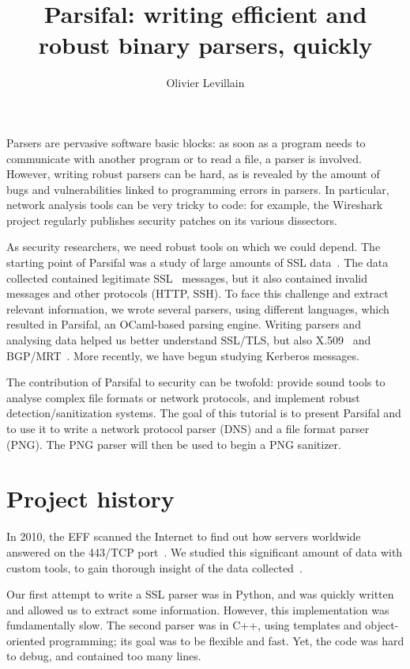 \documentclass{article}
\title{Parsifal: writing efficient and robust binary parsers, quickly}
\author{Olivier Levillain}
\date{}
\begin{document}
\maketitle

Parsers are pervasive software basic blocks: as soon as a program
needs to communicate with another program or to read a file, a parser
is involved. However, writing robust parsers can be hard, as is
revealed by the amount of bugs and vulnerabilities linked to
programming errors in parsers.  In particular, network analysis tools
can be very tricky to code: for example, the Wireshark project
regularly publishes security patches on its various dissectors.

As security researchers, we need robust tools on which we could
depend. The starting point of Parsifal was a study of large amounts of
SSL data~\cite{acsac2012}. The data collected contained legitimate
SSL~\cite{rfc5246} messages, but it also contained invalid messages
and other protocols (HTTP, SSH). To face this challenge and extract
relevant information, we wrote several parsers, using different
languages, which resulted in Parsifal, an OCaml-based parsing
engine. Writing parsers and analysing data helped us better understand
SSL/TLS, but also X.509~\cite{rfc5280} and
BGP/MRT~\cite{rfc4271,rfc6396}. More recently, we have begun studying
Kerberos messages.

The contribution of Parsifal to security can be twofold: provide sound
tools to analyse complex file formats or network protocols, and
implement robust detection/sanitization systems.  The goal of this
tutorial is to present Parsifal and to use it to write a network
protocol parser (DNS) and a file format parser (PNG). The PNG parser
will then be used to begin a PNG sanitizer.



\section{Project history}

In 2010, the EFF scanned the Internet to find out how servers
worldwide answered on the 443/TCP port~\cite{eff-observatory,
  eckersley-obs1, eckersley-obs2}. We studied this significant amount
of data with custom tools, to gain thorough insight of the data
collected~\cite{acsac2012}.

Our first attempt to write a SSL parser was in Python, and was
quickly written and allowed us to extract some information. However,
this implementation was fundamentally slow. The second parser was in
C++, using templates and object-oriented programming; its goal was to
be flexible and fast. Yet, the code was hard to debug, and contained
too many lines.
\end{document}
